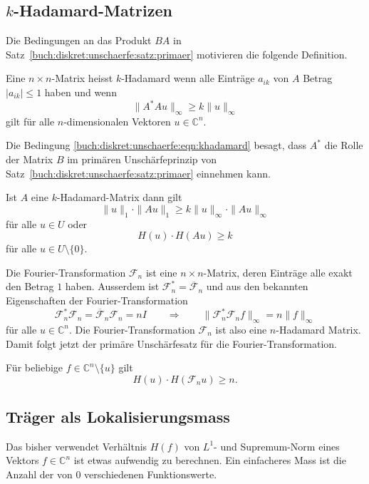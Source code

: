 %
%
\subsection{$k$-Hadamard-Matrizen}
Die Bedingungen an das Produkt $BA$ in
Satz~\ref{buch:diskret:unschaerfe:satz:primaer}
motivieren die folgende Definition.

\begin{definition}
\label{buch:diskret:unschaerfe:def:khadamard}
Eine $n\times n$-Matrix heisst $k$-Hadamard wenn alle Einträge $a_{ik}$ von
$A$ Betrag $|a_{ik}|\le 1$ haben und wenn
\begin{equation}
\|A^*Au\|_\infty \ge k\|u\|_\infty
\label{buch:diskret:unschaerfe:eqn:khadamard}
\end{equation}
gilt für alle $n$-dimensionalen Vektoren $u\in \mathbb{C}^n$.
\end{definition}

Die Bedingung 
\eqref{buch:diskret:unschaerfe:eqn:khadamard}
besagt, dass $A^*$ die Rolle der Matrix $B$ im primären
Unschärfeprinzip von Satz~\ref{buch:diskret:unschaerfe:satz:primaer}
einnehmen kann.

\begin{satz}
Ist $A$ eine $k$-Hadamard-Matrix dann gilt
\[
\|u\|_1\cdot \|Au\|_1 \ge k\|u\|_\infty \cdot \|Au\|_\infty
\]
für alle $u\in U$ oder
\[
H(u)\cdot H(Au)\ge k
\]
für alle $u \in U\setminus\{0\}$.
\end{satz}

Die Fourier-Transformation $\mathscr{F}_n$ ist eine $n\times n$-Matrix,
deren Einträge alle exakt den Betrag $1$ haben.
Ausserdem ist $\mathscr{F}_n^* = \overline{\mathscr{F}}_n$ und aus den 
bekannten Eigenschaften der Fourier-Transformation
\[
\mathscr{F}_n^*\mathscr{F}_n
=
\overline{\mathscr{F}}_n\mathscr{F}_n
=
nI
\qquad\Rightarrow\qquad
\| \mathscr{F}_n^*\mathscr{F}_n f\|_\infty
=
n \|f\|_\infty
\]
für alle $u\in\mathbb{C}^n$.
Die Fourier-Transformation $\mathscr{F}_n$ ist also eine
$n$-Hadamard Matrix.
Damit folgt jetzt der primäre Unschärfesatz für die Fourier-Transformation.

\begin{satz}
Für beliebige $f\in \mathbb{C}^n\setminus\{u\}$ gilt
\begin{equation}
H(u)\cdot H(\mathscr{F}_nu) \ge n.
\end{equation}
\end{satz}

%
%
\subsection{Träger als Lokalisierungsmass}
Das bisher verwendet Verhältnis $H(f)$ von $L^1$- und Supremum-Norm
eines Vektors $f\in\mathbb{C}^n$ ist etwas aufwendig zu berechnen.
Ein einfacheres Mass ist die Anzahl der von $0$ verschiedenen
Funktionswerte.

